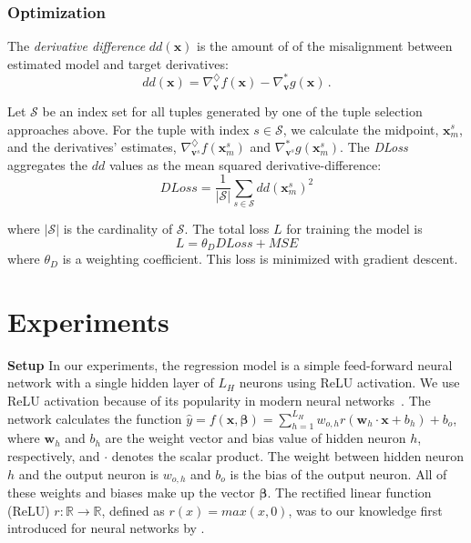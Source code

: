 \documentclass[conference]{IEEEtran}
\begin{document}
\subsubsection{Optimization}
\label{subsec_optimization}
The \emph{derivative difference} $dd(\mathbf{x})$ is the amount of of the misalignment between estimated model and target derivatives: 
\begin{equation}
 dd(\mathbf{x}) = \nabla^{\diamondsuit}_{\mathbf{v}}f(\mathbf{x}) - \nabla^{*}_{\mathbf{v}}g(\mathbf{x})\,.
\end{equation}

Let $\mathcal S$ be an index set for all tuples generated by one of the tuple selection approaches above. For the tuple with index $s\in\mathcal S$, we calculate the midpoint, $\mathbf{x}_m^{s}$, and the derivatives' estimates, $\nabla^{\diamondsuit}_{\mathbf{v}^s}f(\mathbf{x}_m^{s})$ and $\nabla^{*}_{\mathbf{v}^s}g(\mathbf{x}_m^{s})$. 
The \emph{DLoss} aggregates the $dd$ values as the mean squared derivative-difference:
\begin{equation}
 DLoss = \frac{1}{|\mathcal S|} \sum_{s\in\mathcal S} dd(\mathbf{x}_m^{s})^2
\end{equation}

where $|\mathcal S|$ is the cardinality of $\mathcal S$. The total loss $L$ for training the model is
\begin{equation}
 L = \theta_{D} DLoss + MSE
\end{equation}
where $\theta_{D}$ is a weighting coefficient. 
This loss is minimized with gradient descent. 


\section{Experiments}\label{sec:experiments}


\textbf{Setup} In our experiments, the regression model is a simple feed-forward neural network with a single hidden layer of $L_H$ neurons using ReLU activation.
We use ReLU activation because of its popularity in modern neural networks~\cite{goodfellow2016deep}.
The network calculates the function
$\hat{y} = f(\mathbf{x},\boldsymbol{\beta}) =
\sum^{L_H}_{h=1} w_{o,h} r(\mathbf{w}_{h} \cdot \mathbf{x} + b_{h}) + b_{o}$, where $\mathbf{w}_{h}$ and ${b}_{h}$ are the weight vector and bias value of hidden neuron $h$, respectively, and $\cdot$ denotes the scalar product.
The weight between hidden neuron $h$ and the output neuron is $w_{o,h}$ and $b_{o}$ is the bias of the output neuron. 
All of these weights and biases make up the vector $\boldsymbol{\beta}$. 
The rectified linear function (ReLU) $r:\mathbb{R}\rightarrow\mathbb{R}$, defined as $r(x) = max(x,0)$, was to our knowledge first introduced for neural networks  by \cite{fukushima1975relu}. 
\end{document}
